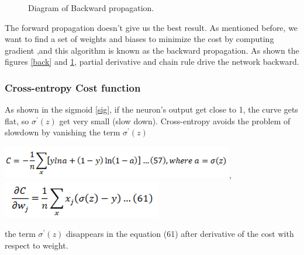 \documentclass{article}
\begin{document}
\begin{figure}[H]
\begin{minipage}[b]{0.3\textwidth}
    \caption{Diagram of Backward propagation.\protect\cite{BK}}
    \label{back2}
  \end{minipage}
\end{figure}

The forward propagation doesn’t give us the best result. As mentioned before, we want to find a set of weights and biases to minimize the cost by computing gradient ,and this algorithm is known as the backward propagation.
As shown the figures \ref{back} and \ref{back2}, partial derivative and chain rule drive the network backward.

\subsubsection{Cross-entropy Cost function}
As shown in the sigmoid \ref{sig}, if the neuron's output get close to 1, the curve gets flat, so $\sigma^{'}(z)$ get very small (slow down).
Cross-entropy avoids the problem of slowdown by vanishing the term $\sigma^{'}(z)$

\includegraphics[scale=0.8]{img/cross.png}, 
\includegraphics[scale=0.6]{img/cross1.png}

the term $\sigma^{'}(z)$ disappears in the equation (61) after derivative of the cost with respect to weight.
\end{document}
